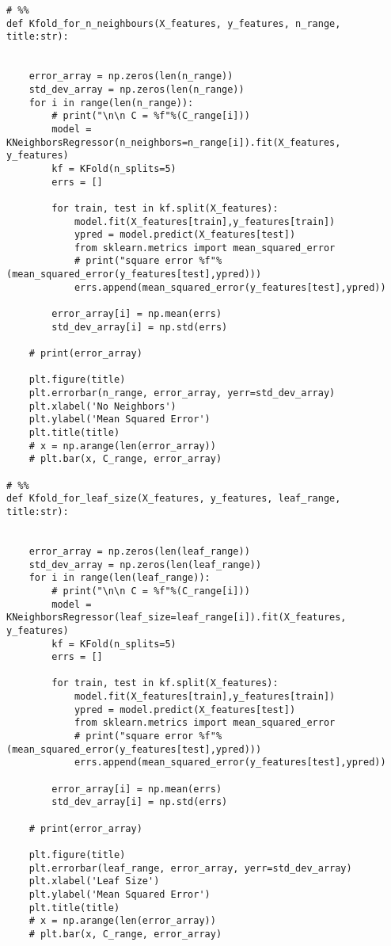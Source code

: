 \begin{verbatim}
# %%
def Kfold_for_n_neighbours(X_features, y_features, n_range, title:str):


    error_array = np.zeros(len(n_range))
    std_dev_array = np.zeros(len(n_range))
    for i in range(len(n_range)):
        # print("\n\n C = %f"%(C_range[i]))
        model = KNeighborsRegressor(n_neighbors=n_range[i]).fit(X_features, y_features)
        kf = KFold(n_splits=5)
        errs = []

        for train, test in kf.split(X_features):
            model.fit(X_features[train],y_features[train])
            ypred = model.predict(X_features[test])
            from sklearn.metrics import mean_squared_error
            # print("square error %f"%(mean_squared_error(y_features[test],ypred)))
            errs.append(mean_squared_error(y_features[test],ypred))
        
        error_array[i] = np.mean(errs)
        std_dev_array[i] = np.std(errs)

    # print(error_array)

    plt.figure(title)
    plt.errorbar(n_range, error_array, yerr=std_dev_array)
    plt.xlabel('No Neighbors')
    plt.ylabel('Mean Squared Error')
    plt.title(title)
    # x = np.arange(len(error_array))
    # plt.bar(x, C_range, error_array)

# %%
def Kfold_for_leaf_size(X_features, y_features, leaf_range, title:str):


    error_array = np.zeros(len(leaf_range))
    std_dev_array = np.zeros(len(leaf_range))
    for i in range(len(leaf_range)):
        # print("\n\n C = %f"%(C_range[i]))
        model = KNeighborsRegressor(leaf_size=leaf_range[i]).fit(X_features, y_features)
        kf = KFold(n_splits=5)
        errs = []

        for train, test in kf.split(X_features):
            model.fit(X_features[train],y_features[train])
            ypred = model.predict(X_features[test])
            from sklearn.metrics import mean_squared_error
            # print("square error %f"%(mean_squared_error(y_features[test],ypred)))
            errs.append(mean_squared_error(y_features[test],ypred))
        
        error_array[i] = np.mean(errs)
        std_dev_array[i] = np.std(errs)

    # print(error_array)

    plt.figure(title)
    plt.errorbar(leaf_range, error_array, yerr=std_dev_array)
    plt.xlabel('Leaf Size')
    plt.ylabel('Mean Squared Error')
    plt.title(title)
    # x = np.arange(len(error_array))
    # plt.bar(x, C_range, error_array)


\end{verbatim}
